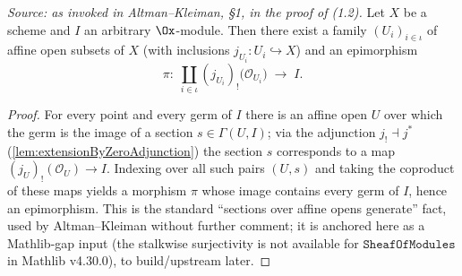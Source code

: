 \begin{theorem}
  \label{thm:exists_extensionByZero_surjection}
  \textit{Source: as invoked in Altman--Kleiman, §1, in the proof of (1.2).}
  Let $X$ be a scheme and $I$ an arbitrary $\Ox$-module. Then there exist a family
  $(U_i)_{i \in \iota}$ of affine open subsets of $X$ (with inclusions
  $j_{U_i} : U_i \hookrightarrow X$) and an epimorphism
  \[
    \pi : \;\coprod_{i \in \iota} (j_{U_i})_!\bigl(\mathcal{O}_{U_i}\bigr)
      \;\longrightarrow\; I .
  \]
  \begin{proof}
    For every point and every germ of $I$ there is an affine open $U$ over which
    the germ is the image of a section $s \in \Gamma(U, I)$; via the adjunction
    $j_! \dashv j^{*}$ (\cref{lem:extensionByZeroAdjunction}) the section $s$
    corresponds to a map $(j_U)_!(\mathcal{O}_U) \to I$. Indexing over all such
    pairs $(U, s)$ and taking the coproduct of these maps yields a morphism
    $\pi$ whose image contains every germ of $I$, hence an epimorphism. This is
    the standard ``sections over affine opens generate'' fact, used by
    Altman--Kleiman without further comment; it is anchored here as a Mathlib-gap
    input (the stalkwise surjectivity is not available for
    $\mathtt{SheafOfModules}$ in Mathlib v4.30.0), to build/upstream later.
  \end{proof}
\end{theorem}

